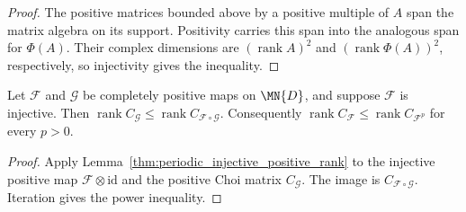 \begin{proof}
    \leanok
    The positive matrices bounded above by a positive multiple of $A$
    span the matrix algebra on its support. Positivity carries this span
    into the analogous span for $\Phi(A)$. Their complex dimensions are
    $(\operatorname{rank}A)^2$ and $(\operatorname{rank}\Phi(A))^2$,
    respectively, so injectivity gives the inequality.
\end{proof}

\begin{lemma}
    \label{thm:periodic_injective_composition_choi_rank}
    \leanok
    Let $\mathcal F$ and $\mathcal G$ be completely positive maps on
    $\MN{D}$, and suppose $\mathcal F$ is injective. Then
    $\operatorname{rank}C_{\mathcal G}\le
        \operatorname{rank}C_{\mathcal F\circ\mathcal G}$.
    Consequently $\operatorname{rank}C_{\mathcal F}\le
        \operatorname{rank}C_{\mathcal F^p}$ for every $p>0$.
\end{lemma}

\begin{proof}
    \leanok
    Apply Lemma~\ref{thm:periodic_injective_positive_rank} to the
    injective positive map $\mathcal F\otimes\mathrm{id}$ and the
    positive Choi matrix $C_{\mathcal G}$. The image is
    $C_{\mathcal F\circ\mathcal G}$. Iteration gives the power inequality.
\end{proof}
